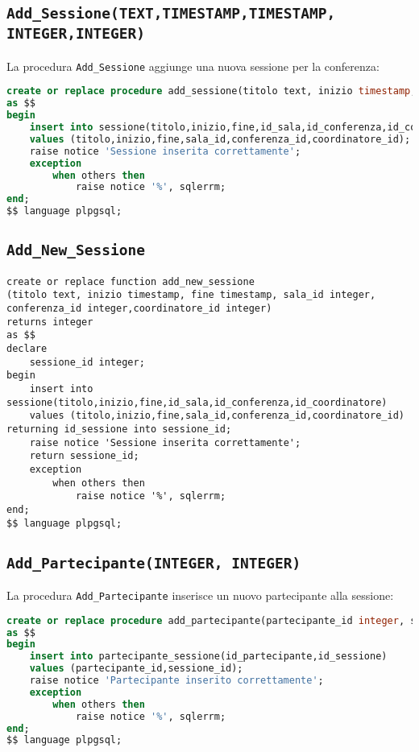 \subsection{\texttt{Add\_Sessione(TEXT,TIMESTAMP,TIMESTAMP, INTEGER,INTEGER)}}
La procedura \texttt{Add\_Sessione} aggiunge una nuova sessione per la conferenza:
\begin{lstlisting}[language=SQL, style=mystyle]
create or replace procedure add_sessione(titolo text, inizio timestamp, fine timestamp, sala_id integer, conferenza_id integer,coordinatore_id integer)
as $$
begin
    insert into sessione(titolo,inizio,fine,id_sala,id_conferenza,id_coordinatore)
    values (titolo,inizio,fine,sala_id,conferenza_id,coordinatore_id);
    raise notice 'Sessione inserita correttamente';
    exception
        when others then
            raise notice '%', sqlerrm;
end;
$$ language plpgsql;
\end{lstlisting}
\subsection{\texttt{Add\_New\_Sessione}}
\begin{lstlisting}
create or replace function add_new_sessione
(titolo text, inizio timestamp, fine timestamp, sala_id integer, conferenza_id integer,coordinatore_id integer) 
returns integer
as $$
declare
    sessione_id integer;
begin
    insert into sessione(titolo,inizio,fine,id_sala,id_conferenza,id_coordinatore)
    values (titolo,inizio,fine,sala_id,conferenza_id,coordinatore_id) returning id_sessione into sessione_id;
    raise notice 'Sessione inserita correttamente';
    return sessione_id;
    exception
        when others then
            raise notice '%', sqlerrm;
end;
$$ language plpgsql;
\end{lstlisting}
\subsection{\texttt{Add\_Partecipante(INTEGER, INTEGER)}}
La procedura \texttt{Add\_Partecipante} inserisce un nuovo partecipante alla sessione:
\begin{lstlisting}[language=SQL, style=mystyle]
create or replace procedure add_partecipante(partecipante_id integer, sessione_id integer)
as $$
begin
    insert into partecipante_sessione(id_partecipante,id_sessione)
    values (partecipante_id,sessione_id);
    raise notice 'Partecipante inserito correttamente';
    exception
        when others then
            raise notice '%', sqlerrm;
end;
$$ language plpgsql;
\end{lstlisting}
